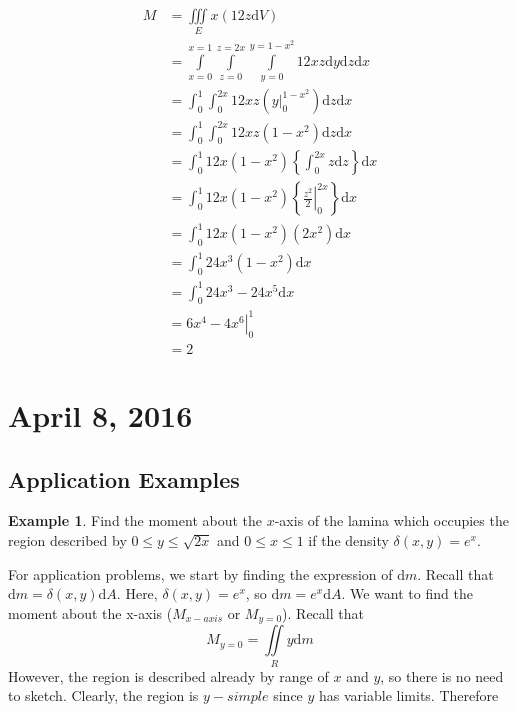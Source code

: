 \documentclass[11pt]{article}
\theoremstyle{plain} %
\theoremstyle{definition}
\theoremstyle{example}
\newtheorem*{example}{Example}
\theoremstyle{remark}
\begin{document}
\begin{align*}
	M &= \iiint \limits_E x \left(12z \mathrm d V \right)\\
	&= 	\int\limits_{x=0}^{x=1} \int\limits_{z=0}^{z=2x}\int\limits_{y=0}^{y=1-x^2} 12xz\mathrm d y \mathrm d z \mathrm d x\\
	&= \int_0^1\int_0^{2x} 12xz \left(\left.y\right|_0^{1-x^2}\right)\mathrm d z \mathrm d x\\
	&= \int_0^1\int_0^{2x} 12xz \left(1-x^2\right)\mathrm d z \mathrm d x\\
	&= \int_0^1 12x\left(1-x^2\right) \left\{\int_0^{2x}z\mathrm d z\right\}\mathrm d x\\
	&= \int_0^1 12x\left(1-x^2\right) \left\{\left.\frac{z^2}{2}\right|_0^{2x}\right\}\mathrm d x\\
	&= \int_0^1 12x\left(1-x^2\right)\left(2x^2\right)\mathrm d x\\	
	&= \int_0^1 24x^3\left(1-x^2\right)\mathrm d x\\
	&= \int_0^1 24x^3-24x^5\mathrm d x\\
	&= \left.6x^4-4x^6\right|_0^1\\
	&= 2
\end{align*}

















\section{April 8, 2016}

\subsection{Application Examples}

\begin{example}
Find the moment about the $x$-axis of the lamina which occupies the region described by $0\leq y \leq \sqrt{2x}$ and $0 \leq x \leq 1$ if the density $\delta (x,y) = e^x$.
\end{example}

For application problems, we start by finding the expression of $\mathrm d m$. Recall that $\mathrm d m = \delta (x,y) \mathrm d A$. Here, $\delta (x,y) = e^x$, so $\mathrm d m = e^x \mathrm d A$. We want to find the moment about the x-axis ($M_{x-axis}$ or $M_{y=0}$). Recall that $$M_{y=0} = \iint \limits_R y \mathrm d m$$ However, the region is described already by range of $x$ and $y$, so there is no need to sketch. Clearly, the region is $y-simple$ since $y$ has variable limits. Therefore
\end{document}
